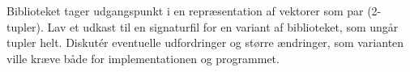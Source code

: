 Biblioteket  tager udgangspunkt i en repræsentation af vektorer som par (2-tupler). Lav et udkast til en signaturfil for en variant af biblioteket, som ungår tupler helt. Diskut\'{e}r eventuelle udfordringer og større ændringer, som varianten ville kræve både for implementationen og programmet.
